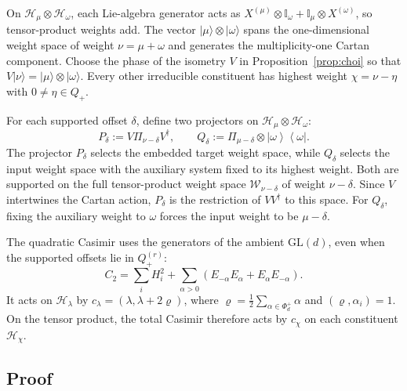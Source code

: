 \documentclass[a4paper,onecolumn,11pt]{quantumarticle}
\newcommand{\ket}[1]{| #1 \rangle}
\newcommand{\ketbra}[2]{\left|#1\right\rangle\!\!\left\langle #2\right|}
\def\id{\mathbb{I}}
\begin{document}
On $\mathcal H_\mu\otimes\mathcal H_\omega$, each Lie-algebra
generator acts as $X^{(\mu)}\otimes\id_\omega+
\id_\mu\otimes X^{(\omega)}$, so tensor-product weights add.
The vector $\ket{\mu}\otimes\ket{\omega}$ spans the one-dimensional
weight space of weight $\nu=\mu+\omega$ and generates the multiplicity-one
Cartan component. Choose the phase of the isometry $V$ in
Proposition~\ref{prop:choi} so that
$V\ket{\nu}=\ket{\mu}\otimes\ket{\omega}$.
Every other irreducible constituent has highest weight
$\chi=\nu-\eta$ with $0\ne\eta\in Q_+$.

For each supported offset $\delta$, define two projectors
on $\mathcal H_\mu\otimes\mathcal H_\omega$:
\begin{equation}\label{eq:proj_mu_omega}
P_\delta:=V\Pi_{\nu-\delta}V^\dagger,\qquad
Q_\delta:=\Pi_{\mu-\delta}\otimes\ketbra{\omega}{\omega}.
\end{equation}
The projector $P_\delta$ selects the embedded target weight space,
while $Q_\delta$ selects the input weight space with the auxiliary
system fixed to its highest weight. Both are supported on the full
tensor-product weight space $\mathcal W_{\nu-\delta}$ of weight
$\nu-\delta$. Since $V$ intertwines the Cartan action, $P_\delta$
is the restriction of $VV^\dagger$ to this space. For $Q_\delta$,
fixing the auxiliary weight to $\omega$ forces the input weight
to be $\mu-\delta$.

The quadratic Casimir uses the generators of the ambient
$\mathrm{GL}(d)$, even when the supported offsets lie in
$Q_+^{(r)}$:
\[
C_2=\sum_i H_i^2+
\sum_{\alpha>0}(E_{-\alpha}E_\alpha+E_\alpha E_{-\alpha}).
\]
It acts on $\mathcal H_\lambda$ by
$c_\lambda=(\lambda,\lambda+2\varrho)$, where
$\varrho=\frac12\sum_{\alpha\in\Phi_d^+}\alpha$ and
$(\varrho,\alpha_i)=1$. On the tensor product, the total Casimir
therefore acts by $c_\chi$ on each constituent $\mathcal H_\chi$.

\subsection{Proof}\label{sec:proof}
\end{document}
